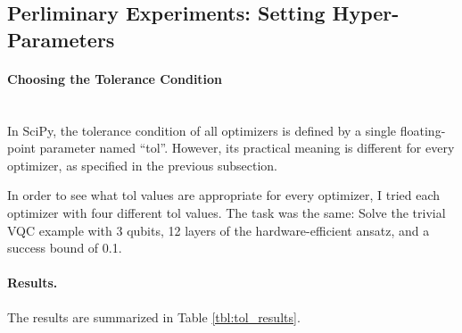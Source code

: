 \documentclass[a4paper,12pt]{article}
\begin{document}
\subsection{Perliminary Experiments: Setting Hyper-Parameters} \label{subsec:exp_hyperparams}

\paragraph*{Choosing the Tolerance Condition}~\\
In SciPy, the tolerance condition of all optimizers is defined by a single floating-point parameter named ``tol''. However, its practical meaning is different for every optimizer, as specified in the previous subsection.

In order to see what tol values are appropriate for every optimizer, I tried each optimizer with four different tol values.
The task was the same: Solve the trivial VQC example with 3 qubits, 12 layers of the hardware-efficient ansatz, and a success bound of 0.1.

\paragraph*{Results.}
The results are summarized in Table \ref{tbl:tol_results}.
\end{document}
